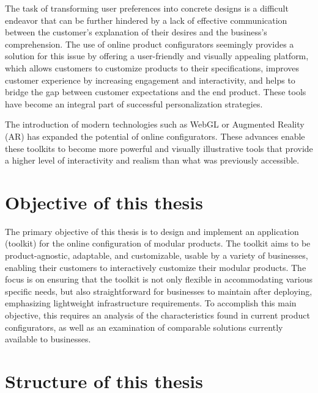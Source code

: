 The task of transforming user preferences into concrete designs is a difficult endeavor that can be further hindered by a lack of effective communication between the customer's explanation of their desires and the business's comprehension. The use of online product configurators seemingly provides a solution for this issue by offering a user-friendly and visually appealing platform, which allows customers to customize products to their specifications, improves customer experience by increasing engagement and interactivity, and helps to bridge the gap between customer expectations and the end product. These tools have become an integral part of successful personalization strategies. \cite{Franke2003}

The introduction of modern technologies such as WebGL or Augmented Reality (AR) has expanded the potential of online configurators. These advances enable these toolkits to become more powerful and visually illustrative tools that provide a higher level of interactivity and realism than what was previously accessible. \cite{Cozzi2015}

\section{Objective of this thesis}

The primary objective of this thesis is to design and implement an application (toolkit) for the online configuration of modular products. The toolkit aims to be product-agnostic, adaptable, and customizable, usable by a variety of businesses, enabling their customers to interactively customize their modular products. The focus is on ensuring that the toolkit is not only flexible in accommodating various specific needs, but also straightforward for businesses to maintain after deploying, emphasizing lightweight infrastructure requirements. 
To accomplish this main objective, this requires an analysis of the characteristics found in current product configurators, as well as an examination of comparable solutions currently available to businesses.

\section{Structure of this thesis}

